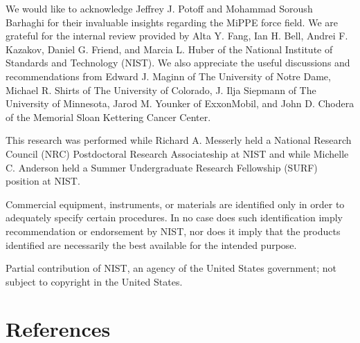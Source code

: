 \documentclass[preprint,review,12pt]{elsarticle}
\begin{document}
	We would like to acknowledge Jeffrey J. Potoff and Mohammad Soroush Barhaghi for their invaluable insights regarding the MiPPE force field. We are grateful for the internal review provided by Alta Y. Fang, Ian H. Bell, Andrei F. Kazakov, Daniel G. Friend, and Marcia L. Huber of the National Institute of Standards and Technology (NIST). We also appreciate the useful discussions and recommendations from Edward J. Maginn of The University of Notre Dame, Michael R. Shirts of The University of Colorado, J. Ilja Siepmann of The University of Minnesota, Jarod M. Younker of ExxonMobil, and John D. Chodera of the Memorial Sloan Kettering Cancer Center. 
	
	This research was performed while Richard A. Messerly held a National Research Council (NRC) Postdoctoral Research Associateship at NIST and while Michelle C. Anderson held a Summer Undergraduate Research Fellowship (SURF) position at NIST. 

	Commercial equipment, instruments, or materials are identified only in order to adequately specify certain procedures. In no case does such identification imply recommendation or endorsement by NIST, nor does it imply that the products identified are necessarily the best available for the intended purpose.
	
	Partial contribution of NIST, an agency of the United States government; not subject to copyright in the United States.
	
	\section*{References}
	
	
	
		
\end{document}
